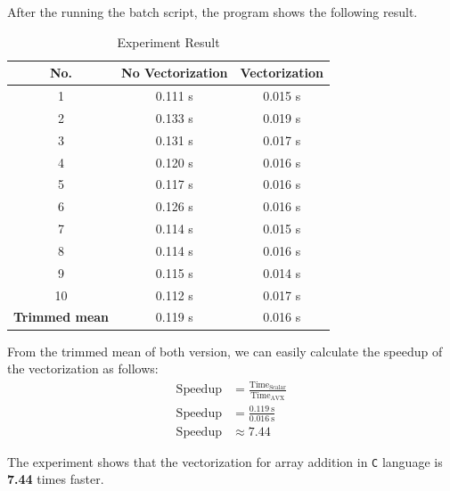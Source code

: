 \documentclass[12pt, a4paper]{article}
\begin{document}
            After the running the batch script, the program shows the following result.

            \begin{table}[h]
                \centering
                \begin{tabular}{|c|c|c|}
                    \hline
                    \rule{0pt}{2.5ex}
                    \textbf{No.} & \textbf{No Vectorization} & \textbf{Vectorization} \\
                    \hline \hline
                    1 & 0.111 s & 0.015 s \\
                    2 & 0.133 s & 0.019 s \\
                    3 & 0.131 s & 0.017 s \\
                    4 & 0.120 s & 0.016 s \\
                    5 & 0.117 s & 0.016 s \\
                    6 & 0.126 s & 0.016 s \\
                    7 & 0.114 s & 0.015 s \\
                    8 & 0.114 s & 0.016 s \\
                    9 & 0.115 s & 0.014 s \\
                    10 & 0.112 s & 0.017 s \\
                    \hline \hline
                    \textbf{Trimmed mean} & 0.119 s & 0.016 s \\
                    \hline
                \end{tabular}
                \caption{Experiment Result}
            \end{table}

            From the trimmed mean of both version, we can easily calculate the speedup of the vectorization as follows:
            \begin{align*}
                \text{Speedup} &= \frac{{\text{Time}}_{\text{Scalar}}}{{\text{Time}}_{\text{AVX}}} \\[1em]
                \text{Speedup} &= \frac{0.119 \ \text{s}}{0.016 \ \text{s}} \\[1em]
                \text{Speedup} &\approx 7.44
            \end{align*}

            The experiment shows that the vectorization for array addition in \texttt{C} language is \textbf{7.44} times faster.

    \pagebreak
\end{document}
